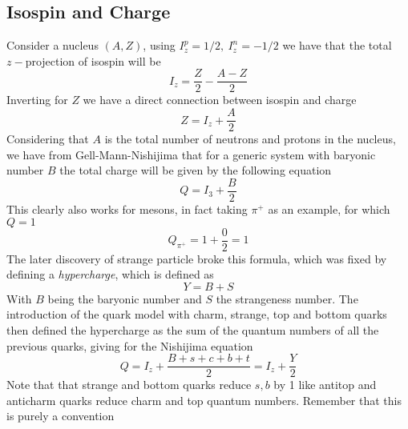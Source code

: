 \documentclass[../qm.tex]{subfiles}
\begin{document}
\subsection{Isospin and Charge}
Consider a nucleus $(A,Z)$, using $I_z^p=1/2,\ I_z^n=-1/2$ we have that the total $z-$projection of isospin will be
\begin{equation}
	I_z=\frac{Z}{2}-\frac{A-Z}{2}
	\label{eq:nucleusisospin}
\end{equation}
Inverting for $Z$ we have a direct connection between isospin and charge
\begin{equation}
	Z=I_z+\frac{A}{2}
	\label{eq:nucleuscharge}
\end{equation}
Considering that $A$ is the total number of neutrons and protons in the nucleus, we have from Gell-Mann-Nishijima that for a generic system with baryonic number $B$ the total charge will be given by the following equation
\begin{equation}
	Q=I_3+\frac{B}{2}
	\label{eq:gellmannnishijima}
\end{equation}
This clearly also works for mesons, in fact taking $\pi^+$ as an example, for which $Q=1$
\begin{equation*}
	Q_{\pi^+}=1+\frac{0}{2}=1
\end{equation*}
The later discovery of strange particle broke this formula, which was fixed by defining a \textit{hypercharge}, which is defined as
\begin{equation}
	Y=B+S
	\label{eq:hypercharge}
\end{equation}
With $B$ being the baryonic number and $S$ the strangeness number.
The introduction of the quark model with charm, strange, top and bottom quarks then defined the hypercharge as the sum of the quantum numbers of all the previous quarks, giving for the Nishijima equation
\begin{equation}
	Q=I_z+\frac{B+s+c+b+t}{2}=I_z+\frac{Y}{2}
	\label{eq:nishijimaquarks}
\end{equation}
Note that that strange and bottom quarks reduce $s,b$ by 1 like antitop and anticharm quarks reduce charm and top quantum numbers. Remember that this is purely a convention
\end{document}

